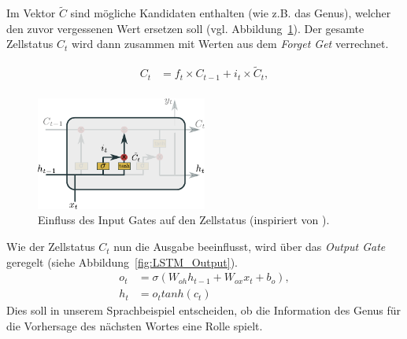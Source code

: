             Im Vektor $\tilde{C}$ sind mögliche Kandidaten enthalten (wie z.B. das Genus), welcher den zuvor vergessenen Wert ersetzen soll (vgl. Abbildung~\ref{fig:LSTM_Input}).
            Der gesamte Zellstatus $C_t$ wird dann zusammen mit Werten aus dem \textit{Forget Get} verrechnet.

            \begin{equation}
                \begin{split}
                    C_t &=f_t\times C_{t-1} + i_t\times \tilde{C}_t, \\
                \end{split}
            \end{equation}

                \begin{figure}[h]
                    \centering
                    \includegraphics[width=0.5\textwidth]{images/Illustrationen/LSTM_IG}
                    \caption{Einfluss des Input Gates auf den Zellstatus (inspiriert von \cite{OLAH2015}).}
                    \label{fig:LSTM_Input}
                \end{figure}
            
            Wie der Zellstatus $C_t$ nun die Ausgabe beeinflusst, wird über das \textit{Output Gate} geregelt (siehe Abbildung~\ref{fig:LSTM_Output}).
            \begin{equation}
                \begin{split}
                    o_t &= \sigma\left(W_{oh}h_{t-1} + W_{ox}x_t + b_o \right), \\
                    h_t &= o_ttanh\left(c_t\right)
                \end{split}
            \end{equation}
            Dies soll in unserem Sprachbeispiel entscheiden, ob die Information des Genus für die Vorhersage des nächsten Wortes eine Rolle spielt. \cite{GERS2000} \cite{OLAH2015}

